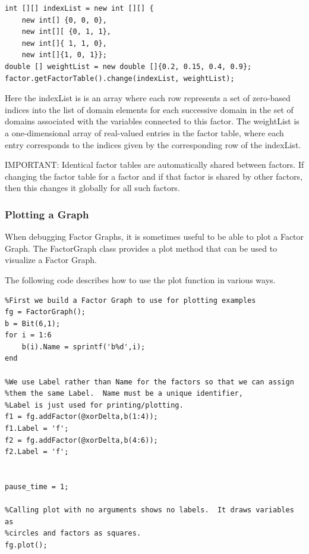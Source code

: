 \fi

\ifjava
\begin{lstlisting}
int [][] indexList = new int [][] {
	new int[] {0, 0, 0},
	new int[][ {0, 1, 1},
	new int[]{ 1, 1, 0},
	new int[]{1, 0, 1}};
double [] weightList = new double []{0.2, 0.15, 0.4, 0.9};
factor.getFactorTable().change(indexList, weightList);
\end{lstlisting}
\fi

Here the indexList is is an array where each row represents a set of zero-based indices into the list of domain elements for each successive domain in the set of domains associated with the variables connected to this factor.  The weightList is a one-dimensional array of real-valued entries in the factor table, where each entry corresponds to the indices given by the corresponding row of the indexList.

IMPORTANT: Identical factor tables are automatically shared between factors.  If changing the factor table for a factor and if that factor is shared by other factors, then this changes it globally for all such factors.


\subsubsection{Plotting a Graph}

\ifmatlab

\label{sec:PlottingAGraph}

When debugging Factor Graphs, it is sometimes useful to be able to plot a Factor Graph.  The FactorGraph class provides a plot method that can be used to visualize a Factor Graph.

The following code describes how to use the plot function in various ways.

\begin{lstlisting}
%First we build a Factor Graph to use for plotting examples
fg = FactorGraph();
b = Bit(6,1);
for i = 1:6
    b(i).Name = sprintf('b%d',i);
end
 
%We use Label rather than Name for the factors so that we can assign
%them the same Label.  Name must be a unique identifier,
%Label is just used for printing/plotting.
f1 = fg.addFactor(@xorDelta,b(1:4));
f1.Label = 'f';
f2 = fg.addFactor(@xorDelta,b(4:6));
f2.Label = 'f';
 
 
pause_time = 1;
 
%Calling plot with no arguments shows no labels.  It draws variables as
%circles and factors as squares.
fg.plot();
\end{lstlisting}

